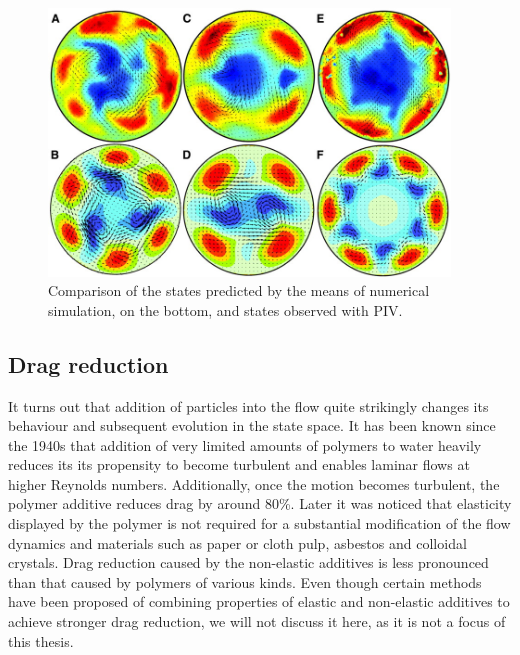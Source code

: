 \documentclass[11pt,a4paper]{article}
\begin{document}
\begin{figure}[h!]
    \centering
    \includegraphics[width=0.95\textwidth]{experiment_vs_simulation.jpg}
    \caption{Comparison of the states predicted by the means of numerical simulation, on the bottom, and states observed with PIV\cite{Hof04etal}.}\label{img:ex_simu}
\end{figure}

\subsection{Drag reduction}

It turns out that addition of particles into the flow quite strikingly changes its behaviour and subsequent evolution in the state space.
It has been known since the 1940s\cite{Toms49}\cite{Mysels72} that addition of very limited amounts of polymers to water heavily reduces its its propensity to become turbulent and enables laminar flows at higher Reynolds numbers.
Additionally, once the motion becomes turbulent, the polymer additive reduces drag by around 80\%\cite{Sreenivasan00}.
Later it was noticed that elasticity displayed by the polymer is not required for a substantial modification of the flow dynamics\cite{Pashkewitz04} and materials such as paper or cloth pulp\cite{Radin75}\cite{Robertson57}, asbestos\cite{Mccomb85} and colloidal crystals\cite{Pirith72}\cite{Radin75}.
Drag reduction caused by the non-elastic additives is less pronounced than that caused by polymers of various kinds.
Even though certain methods have been proposed\cite{Pashkewitz04}\cite{Lee74} of combining properties of elastic and non-elastic additives to achieve stronger drag reduction, we will not discuss it here, as it is not a focus of this thesis.
\end{document}
